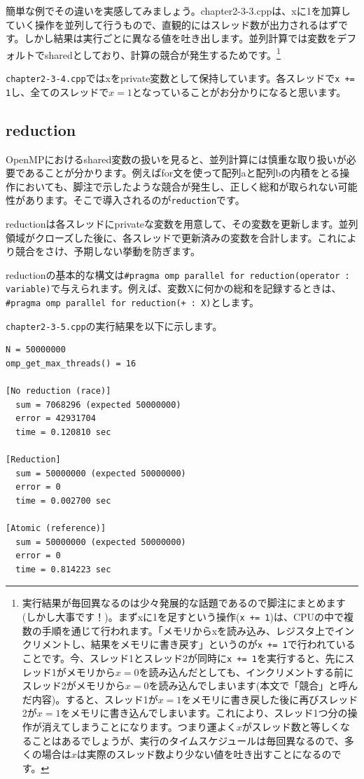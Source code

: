 \documentclass[12pt]{jreport}
\begin{document}
簡単な例でその違いを実感してみましょう。chapter2-3-3.cppは、xに1を加算していく操作を並列して行うもので、直観的にはスレッド数が出力されるはずです。しかし結果は実行ごとに異なる値を吐き出します。並列計算では変数をデフォルトでsharedとしており、計算の競合が発生するためです。\footnote[1]{実行結果が毎回異なるのは少々発展的な話題であるので脚注にまとめます(しかし大事です！)。まずxに1を足すという操作(\texttt{x += 1})は、CPUの中で複数の手順を通じて行われます。「メモリからxを読み込み、レジスタ上でインクリメントし、結果をメモリに書き戻す」というのが\texttt{x += 1}で行われていることです。今、スレッド1とスレッド2が同時に\texttt{x += 1}を実行すると、先にスレッド1がメモリから$x = 0$を読み込んだとしても、インクリメントする前にスレッド2がメモリから$x = 0$を読み込んでしまいます(本文で「競合」と呼んだ内容)。すると、スレッド1が$x = 1$をメモリに書き戻した後に再びスレッド2が$x = 1$をメモリに書き込んでしまいます。これにより、スレッド1つ分の操作が消えてしまうことになります。つまり運よく$x$がスレッド数と等しくなることはあるでしょうが、実行のタイムスケジュールは毎回異なるので、多くの場合は$x$は実際のスレッド数より少ない値を吐き出すことになるのです。}

\texttt{chapter2-3-4.cpp}ではxをprivate変数として保持しています。各スレッドで\texttt{x += 1}し、全てのスレッドで$x = 1$となっていることがお分かりになると思います。

\subsection{reduction}
OpenMPにおけるshared変数の扱いを見ると、並列計算には慎重な取り扱いが必要であることが分かります。例えばfor文を使って配列aと配列bの内積をとる操作においても、脚注で示したような競合が発生し、正しく総和が取られない可能性があります。そこで導入されるのが\texttt{reduction}です。

reductionは各スレッドにprivateな変数を用意して、その変数を更新します。並列領域がクローズした後に、各スレッドで更新済みの変数を合計します。これにより競合をさけ、予期しない挙動を防ぎます。

reductionの基本的な構文は\texttt{\#pragma omp parallel for reduction(operator : variable)}で与えられます。例えば、変数Xに何かの総和を記録するときは、\texttt{\#pragma omp parallel for reduction(+ : X)}とします。

\texttt{chapter2-3-5.cpp}の実行結果を以下に示します。

\begin{lstlisting}[style=terminal]
N = 50000000
omp_get_max_threads() = 16

[No reduction (race)]
  sum = 7068296 (expected 50000000)
  error = 42931704
  time = 0.120810 sec

[Reduction]
  sum = 50000000 (expected 50000000)
  error = 0
  time = 0.002700 sec

[Atomic (reference)]
  sum = 50000000 (expected 50000000)
  error = 0
  time = 0.814223 sec  
\end{lstlisting}
\end{document}
